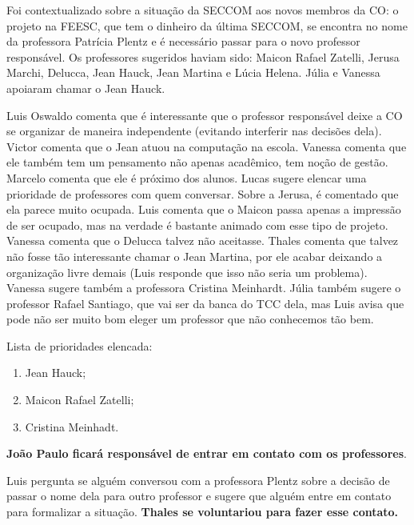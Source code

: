 \documentclass{ata-seccom}
\begin{document}
\maketitle


Foi contextualizado sobre a situação da SECCOM aos novos membros da CO\@: o
projeto na FEESC, que tem o dinheiro da última SECCOM, se encontra no nome da
professora Patrícia Plentz e é necessário passar para o novo professor
responsável. Os professores sugeridos haviam sido: Maicon Rafael Zatelli,
Jerusa Marchi, Delucca, Jean Hauck, Jean Martina e Lúcia Helena. Júlia e
Vanessa apoiaram chamar o Jean Hauck.

Luis Oswaldo comenta que é interessante que o professor responsável deixe a CO
se organizar de maneira independente (evitando interferir nas decisões dela).
Victor comenta que o Jean atuou na computação na escola. Vanessa comenta que
ele também tem um pensamento não apenas acadêmico, tem noção de gestão. Marcelo
comenta que ele é próximo dos alunos. Lucas sugere elencar uma prioridade de
professores com quem conversar.  Sobre a Jerusa, é comentado que ela parece
muito ocupada. Luis comenta que o Maicon passa apenas a impressão de ser
ocupado, mas na verdade é bastante animado com esse tipo de projeto. Vanessa
comenta que o Delucca talvez não aceitasse. Thales comenta que talvez não fosse
tão interessante chamar o Jean Martina, por ele acabar deixando a organização
livre demais (Luis responde que isso não seria um problema). Vanessa sugere
também a professora Cristina Meinhardt. Júlia também sugere o professor Rafael
Santiago, que vai ser da banca do TCC dela, mas Luis avisa que pode não ser
muito bom eleger um professor que não conhecemos tão bem.

Lista de prioridades elencada:

\begin{enumerate}
    \item Jean Hauck;
    \item Maicon Rafael Zatelli;
    \item Cristina Meinhadt.
\end{enumerate}

\textbf{João Paulo ficará responsável de entrar em contato com os professores}.

Luis pergunta se alguém conversou com a professora Plentz sobre a decisão de
passar o nome dela para outro professor e sugere que alguém entre em contato
para formalizar a situação. \textbf{Thales se voluntariou para fazer esse
contato.}
\end{document}
